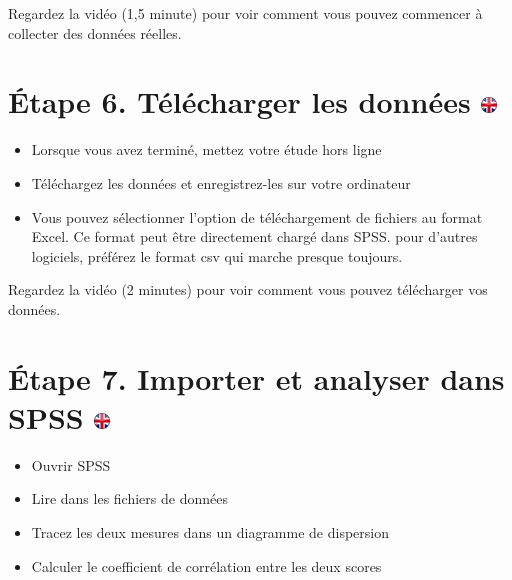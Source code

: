 \documentclass[
]{book}
\providecommand{\tightlist}{%
  \setlength{\itemsep}{0pt}\setlength{\parskip}{0pt}}
\begin{document}
Regardez la vidéo (1,5 minute) pour voir comment vous pouvez commencer à
collecter des données réelles.

\hypertarget{uxe9tape-6.-tuxe9luxe9charger-les-donnuxe9es}{%
\section[Étape 6. Télécharger les données ]{\texorpdfstring{Étape 6.
Télécharger les données
\href{https://www.psytoolkit.org/lessons/questionnaire-project.html\#_step_6_download_data}{\protect\includegraphics{img/ukflag.png}}}{Étape 6. Télécharger les données }}\label{uxe9tape-6.-tuxe9luxe9charger-les-donnuxe9es}}

\begin{itemize}
\tightlist
\item
  Lorsque vous avez terminé, mettez votre étude hors ligne
\item
  Téléchargez les données et enregistrez-les sur votre ordinateur
\item
  Vous pouvez sélectionner l'option de téléchargement de fichiers au
  format Excel. Ce format peut être directement chargé dans SPSS. pour
  d'autres logiciels, préférez le format csv qui marche presque
  toujours.
\end{itemize}

Regardez la vidéo (2 minutes) pour voir comment vous pouvez télécharger
vos données.

\hypertarget{uxe9tape-7.-importer-et-analyser-dans-spss}{%
\section[Étape 7. Importer et analyser dans SPSS ]{\texorpdfstring{Étape
7. Importer et analyser dans SPSS
\href{https://www.psytoolkit.org/lessons/questionnaire-project.html\#_step_7_import_and_analyze_in_spss}{\protect\includegraphics{img/ukflag.png}}}{Étape 7. Importer et analyser dans SPSS }}\label{uxe9tape-7.-importer-et-analyser-dans-spss}}

\begin{itemize}
\tightlist
\item
  Ouvrir SPSS
\item
  Lire dans les fichiers de données
\item
  Tracez les deux mesures dans un diagramme de dispersion
\item
  Calculer le coefficient de corrélation entre les deux scores
\end{itemize}
\end{document}
